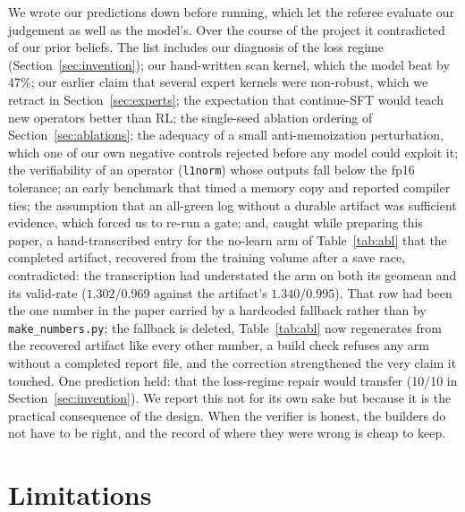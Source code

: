 \documentclass[10pt]{article}
\begin{document}
We wrote our predictions down before running, which let the referee evaluate our judgement
as well as the model's. Over the course of the project it contradicted \falsifications{} of
our prior beliefs. The list includes our diagnosis of the loss regime
(Section~\ref{sec:invention}); our hand-written scan kernel, which the model beat by 47\%;
our earlier claim that several expert kernels were non-robust, which we retract in
Section~\ref{sec:experts}; the expectation that continue-SFT would teach new operators
better than RL; the single-seed ablation ordering of Section~\ref{sec:ablations}; the
adequacy of a small anti-memoization perturbation, which one of our own negative controls
rejected before any model could exploit it; the verifiability of an operator (\texttt{l1norm})
whose outputs fall below the fp16 tolerance; an early benchmark that timed a memory copy and
reported compiler ties; the assumption that an all-green log without a durable artifact
was sufficient evidence, which forced us to re-run a gate; and, caught while preparing this
paper, a hand-transcribed entry for the no-learn arm of Table~\ref{tab:abl} that the
completed artifact, recovered from the training volume after a save race, contradicted: the
transcription had understated the arm on both its geomean and its valid-rate ($1.302$/$0.969$
against the artifact's $1.340$/$0.995$). That row had been the one number in the paper
carried by a hardcoded fallback rather than by \texttt{make\_numbers.py}; the fallback is
deleted, Table~\ref{tab:abl} now regenerates from the recovered artifact like every other
number, a build check refuses any arm without a completed report file, and the correction
strengthened the very claim it touched. One prediction held: that the
loss-regime repair would transfer (10/10 in Section~\ref{sec:invention}). We report this not
for its own sake but because it is the practical consequence of the design. When the
verifier is honest, the builders do not have to be right, and the record of where they were
wrong is cheap to keep.

\section{Limitations}\label{sec:bounds}
\end{document}
